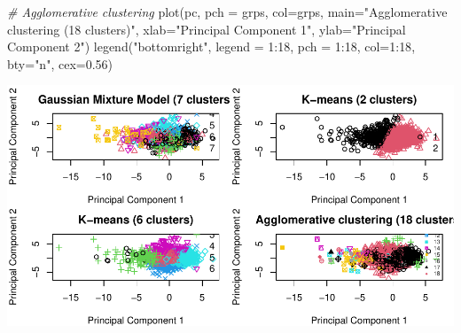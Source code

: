 \documentclass[
]{article}
\newenvironment{Shaded}{\begin{snugshade}}{\end{snugshade}}
\newcommand{\AttributeTok}[1]{\textcolor[rgb]{0.77,0.63,0.00}{#1}}
\newcommand{\CommentTok}[1]{\textcolor[rgb]{0.56,0.35,0.01}{\textit{#1}}}
\newcommand{\DecValTok}[1]{\textcolor[rgb]{0.00,0.00,0.81}{#1}}
\newcommand{\FloatTok}[1]{\textcolor[rgb]{0.00,0.00,0.81}{#1}}
\newcommand{\FunctionTok}[1]{\textcolor[rgb]{0.00,0.00,0.00}{#1}}
\newcommand{\NormalTok}[1]{#1}
\newcommand{\SpecialCharTok}[1]{\textcolor[rgb]{0.00,0.00,0.00}{#1}}
\newcommand{\StringTok}[1]{\textcolor[rgb]{0.31,0.60,0.02}{#1}}
\begin{document}
\begin{Shaded}
\begin{Highlighting}[]
\CommentTok{\# Agglomerative clustering}
\FunctionTok{plot}\NormalTok{(pc, }\AttributeTok{pch =}\NormalTok{ grps, }\AttributeTok{col=}\NormalTok{grps, }\AttributeTok{main=}\StringTok{"Agglomerative clustering (18 clusters)"}\NormalTok{, }
       \AttributeTok{xlab=}\StringTok{"Principal Component 1"}\NormalTok{, }\AttributeTok{ylab=}\StringTok{"Principal Component 2"}\NormalTok{)}
\FunctionTok{legend}\NormalTok{(}\StringTok{"bottomright"}\NormalTok{, }\AttributeTok{legend =} \DecValTok{1}\SpecialCharTok{:}\DecValTok{18}\NormalTok{, }\AttributeTok{pch =} \DecValTok{1}\SpecialCharTok{:}\DecValTok{18}\NormalTok{, }\AttributeTok{col=}\DecValTok{1}\SpecialCharTok{:}\DecValTok{18}\NormalTok{, }\AttributeTok{bty=}\StringTok{"n"}\NormalTok{, }\AttributeTok{cex=}\FloatTok{0.56}\NormalTok{)}
\end{Highlighting}
\end{Shaded}

\includegraphics{Influence_factors_files/figure-latex/3.11_ca_comparison_munic-1.pdf}
\end{document}
